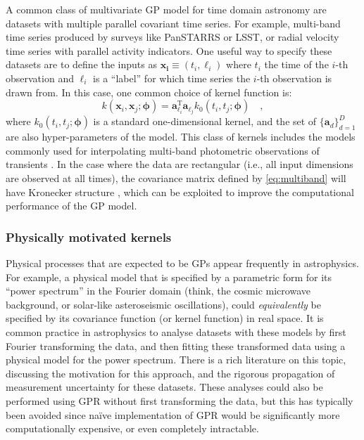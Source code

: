 \documentclass[letterpaper]{ar-1col}
\newcommand{\hyperparams}{\ensuremath{\boldsymbol{\phi}}}
\begin{document}
A common class of multivariate GP model for time domain astronomy are datasets with multiple parallel covariant time series.
For example, multi-band time series produced by surveys like PanSTARRS or LSST, or radial velocity time series with parallel activity indicators.
One useful way to specify these datasets are to define the inputs as $\boldsymbol{x_i} \equiv (t_i,\ell_i)$ where $t_i$ the time of the $i$-th observation and $\ell_i$ is a ``label'' for which time series the $i$-th observation is drawn from.
In this case, one common choice of kernel function is:
\begin{equation}\label{eq:multiband}
  k(\boldsymbol{x}_i,\boldsymbol{x}_j;\hyperparams) = \boldsymbol{a}_{\ell_i}^\mathrm{T} \boldsymbol{a}_{\ell_j} k_0(t_i,t_j;\hyperparams) \quad,
\end{equation}
where $k_0(t_i,t_j;\hyperparams)$ is a standard one-dimensional kernel, and the set of $\{\boldsymbol{a}_d\}_{d=1}^D$ are also hyper-parameters of the model.
This class of kernels includes the models commonly used for interpolating multi-band photometric observations of transients \citep[e.g.,][]{2020ApJ...905...94V, 2021ApJS..255...24V}.
In the case where the data are rectangular (i.e., all input dimensions are observed at all times), the covariance matrix defined by \autoref{eq:multiband} will have Kronecker structure \citep[e.g.,][]{2015arXiv151101870W, 2020AJ....160..240G}, which can be exploited to improve the computational performance of the GP model.

\subsubsection{Physically motivated kernels}
\label{sec:physical}
Physical processes that are expected to be GPs appear frequently in astrophysics.
For example, a physical model that is specified by a parametric form for its ``power spectrum'' in the Fourier domain (think, the cosmic microwave background, or solar-like asteroseismic oscillations), could \emph{equivalently} be specified by its covariance function (or kernel function) in real space.
It is common practice in astrophysics to analyse datasets with these models by first Fourier transforming the data, and then fitting these transformed data using a physical model for the power spectrum.
There is a rich literature on this topic, discussing the motivation for this approach, and the rigorous propagation of measurement uncertainty for these datasets.
These analyses could also be performed using GPR without first transforming the data, but this has typically been avoided since na\"ive implementation of GPR would be significantly more computationally expensive, or even completely intractable.
\end{document}
